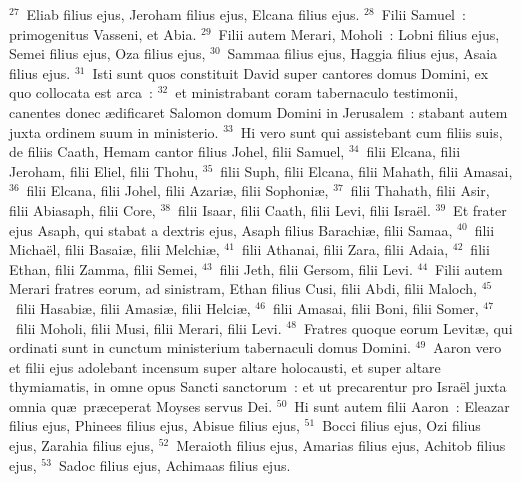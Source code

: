 ${}^{27}$~Eliab filius ejus, Jeroham filius ejus, Elcana filius ejus.
${}^{28}$~Filii Samuel~: primogenitus Vasseni, et Abia.
${}^{29}$~Filii autem Merari, Moholi~: Lobni filius ejus, Semei filius ejus, Oza filius ejus,
${}^{30}$~Sammaa filius ejus, Haggia filius ejus, Asaia filius ejus.
${}^{31}$~Isti sunt quos constituit David super cantores domus Domini, ex quo collocata est arca~:
${}^{32}$~et ministrabant coram tabernaculo testimonii, canentes donec \ae dificaret Salomon domum Domini in Jerusalem~: stabant autem juxta ordinem suum in ministerio.
${}^{33}$~Hi vero sunt qui assistebant cum filiis suis, de filiis Caath, Hemam cantor filius Johel, filii Samuel,
${}^{34}$~filii Elcana, filii Jeroham, filii Eliel, filii Thohu,
${}^{35}$~filii Suph, filii Elcana, filii Mahath, filii Amasai,
${}^{36}$~filii Elcana, filii Johel, filii Azari\ae , filii Sophoni\ae ,
${}^{37}$~filii Thahath, filii Asir, filii Abiasaph, filii Core,
${}^{38}$~filii Isaar, filii Caath, filii Levi, filii Isra\"el.
${}^{39}$~Et frater ejus Asaph, qui stabat a dextris ejus, Asaph filius Barachi\ae , filii Samaa,
${}^{40}$~filii Micha\"el, filii Basai\ae , filii Melchi\ae ,
${}^{41}$~filii Athanai, filii Zara, filii Adaia,
${}^{42}$~filii Ethan, filii Zamma, filii Semei,
${}^{43}$~filii Jeth, filii Gersom, filii Levi.
${}^{44}$~Filii autem Merari fratres eorum, ad sinistram, Ethan filius Cusi, filii Abdi, filii Maloch,
${}^{45}$~filii Hasabi\ae , filii Amasi\ae , filii Helci\ae ,
${}^{46}$~filii Amasai, filii Boni, filii Somer,
${}^{47}$~filii Moholi, filii Musi, filii Merari, filii Levi.
${}^{48}$~Fratres quoque eorum Levit\ae , qui ordinati sunt in cunctum ministerium tabernaculi domus Domini.
${}^{49}$~Aaron vero et filii ejus adolebant incensum super altare holocausti, et super altare thymiamatis, in omne opus Sancti sanctorum~: et ut precarentur pro Isra\"el juxta omnia qu\ae\ pr\ae ceperat Moyses servus Dei.
${}^{50}$~Hi sunt autem filii Aaron~: Eleazar filius ejus, Phinees filius ejus, Abisue filius ejus,
${}^{51}$~Bocci filius ejus, Ozi filius ejus, Zarahia filius ejus,
${}^{52}$~Meraioth filius ejus, Amarias filius ejus, Achitob filius ejus,
${}^{53}$~Sadoc filius ejus, Achimaas filius ejus.


